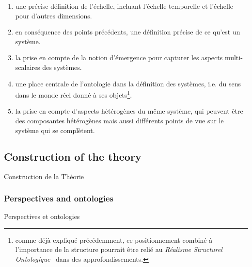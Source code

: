 {\begin{enumerate}
\item une précise définition de l'échelle, incluant l'échelle temporelle et l'échelle pour d'autres dimensions.
\item en conséquence des points précédents, une définition précise de ce qu'est un système.
\item la prise en compte de la notion d'émergence pour capturer les aspects multi-scalaires des systèmes.
\item une place centrale de l'ontologie dans la définition des systèmes, i.e. du sens dans le monde réel donné à ses objets\footnote{comme déjà expliqué précédemment, ce positionnement combiné à l'importance de la structure pourrait être relié au \emph{Réalisme Structurel Ontologique}~\cite{frigg2011everything} dans des approfondissements.}.
\item la prise en compte d'aspects hétérogènes du même système, qui peuvent être des composantes hétérogènes mais aussi différents points de vue sur le système qui se complètent.
\end{enumerate}
}





\subsection{Construction of the theory}{Construction de la Théorie}


\subsubsection{Perspectives and ontologies}{Perspectives et ontologies}



